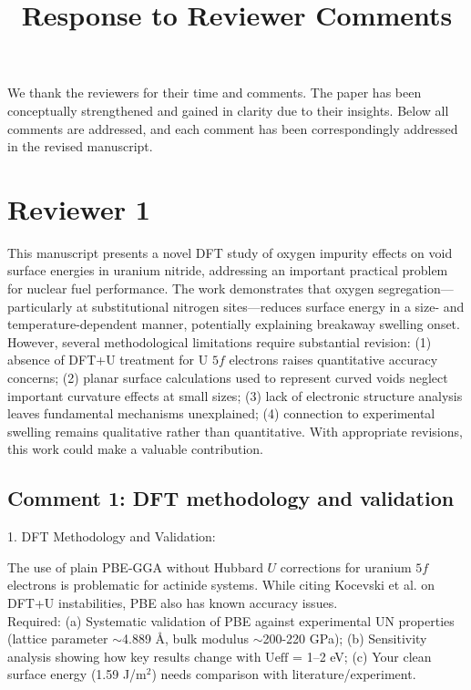 \documentclass[12pt]{article}
\title{Response to Reviewer Comments}
\author{}
\date{}
\begin{document}
\maketitle

We thank the reviewers for their time and comments. The paper has been conceptually strengthened and gained in clarity due to their insights. Below all comments are addressed, and each comment has been correspondingly addressed in the revised manuscript. 


\section*{Reviewer 1}

\color{blue}

This manuscript presents a novel DFT study of oxygen impurity effects on void surface energies in uranium nitride, addressing an important practical problem for nuclear fuel performance. The work demonstrates that oxygen segregation---particularly at substitutional nitrogen sites---reduces surface energy in a size- and temperature-dependent manner, potentially explaining breakaway swelling onset. However, several methodological limitations require substantial revision: (1) absence of DFT+U treatment for U $5f$ electrons raises quantitative accuracy concerns; (2) planar surface calculations used to represent curved voids neglect important curvature effects at small sizes; (3) lack of electronic structure analysis leaves fundamental mechanisms unexplained; (4) connection to experimental swelling remains qualitative rather than quantitative. With appropriate revisions, this work could make a valuable contribution.

\color{black}

\subsection*{Comment 1: DFT methodology and validation}

\color{blue}

1. DFT Methodology and Validation:

The use of plain PBE-GGA without Hubbard $U$ corrections for uranium $5f$ electrons is problematic for actinide systems. While citing Kocevski et al. on DFT+U instabilities, PBE also has known accuracy issues.
\\

Required: (a) Systematic validation of PBE against experimental UN properties (lattice parameter $\sim$4.889 \AA, bulk modulus $\sim$200-220 GPa); (b) Sensitivity analysis showing how key results change with U$\text{eff}$ = 1--2 eV; (c) Your clean surface energy (1.59 J/m$^2$) needs comparison with literature/experiment.
\end{document}
